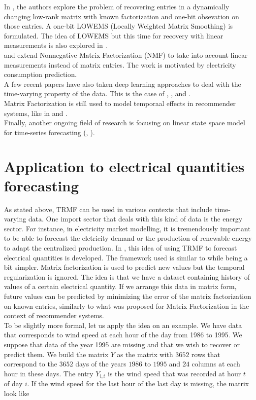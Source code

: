 \documentclass{article}
\begin{document}
In \cite{1bit}, the authors explore the problem of recovering entries in a dynamically changing low-rank matrix with known factorization and one-bit obsevation on those entries. A one-bit LOWEMS (Locally Weighted Matrix Smoothing) is formulated. The idea of LOWEMS but this time for recovery with linear measurements is also explored in \cite{LOWEMS}.\\
\cite{linear1} and \cite{linear2} extend Nonnegative Matrix Factorization (NMF) to take into account linear measurements instead of matrix entries. The work is motivated by electricity consumption prediction. \\
A few recent papers have also taken deep learning approaches to deal with the time-varying property of the data. This is the case of \cite{ChungGCB14}, \cite{Yoon2017MultidirectionalRN}, \cite{deep1} and \cite{deep2}. \\
Matrix Factorization is still used to model temporaal effects in recommender systems, like in \cite{rs1} and \cite{rs2}. \\
Finally, another ongoing field of research is focusing on linear state space model for time-series forecasting (\cite{ss1}, \cite{ss2}). \\

\section{Application to electrical quantities forecasting}
\label{app}
As stated above, TRMF can be used in various contexts that include time-varying data. One import sector that deals with this kind of data is the energy sector.
For instance, in electricity market modelling, it is tremendously important to be able to forecast the elctricity demand or the production of renewable energy to adapt the centralized production.
In \cite{Elec}, this idea of using TRMF to forecast electrical quantities is developed.
The framework used is similar to \cite{TRMF} while being a bit simpler. Matrix factorization is used to predict new values but the temporal regularization is ignored. The idea is that we have a dataset containing history of values of a certain electrical quantity. If we arrange this data in matrix form, future values can be predicted by minimizing the error of the matrix factorization on known entries, similarly to what was proposed for Matrix Factorization in the context of recommender systems. \\
To be slightly more formal, let us apply the idea on an example. We have data that corresponds to wind speed at each hour of the day from 1986 to 1995. We suppose that data of the year 1995 are missing and that we wish to recover or predict them. We build the matrix $Y$ as the matrix with $3652$ rows that correspond to the $3652$ days of the years $1986$ to $1995$ and $24$ columns at each hour in these days. The entry $Y_{i,t}$ is the wind speed that was recorded at hour $t$ of day $i$. If the wind speed for the last hour of the last day is missing, the matrix look like
\end{document}
